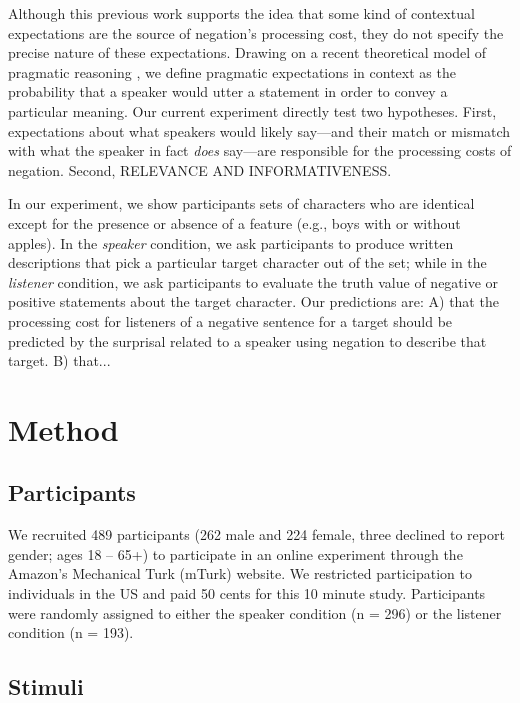 \documentclass[man, noapacite]{apa2}
\begin{document}
Although this previous work supports the idea that some kind of contextual expectations are the source of negation's processing cost, they do not specify the precise nature of these expectations. Drawing on a recent theoretical model of pragmatic reasoning \cite{frank2012}, we define pragmatic expectations in context as the probability that a speaker would utter a statement in order to convey a particular meaning. Our current experiment directly test two hypotheses. First, expectations about what speakers would likely say---and their match or mismatch with what the speaker in fact \emph{does} say---are responsible for the processing costs of negation. Second, RELEVANCE AND INFORMATIVENESS.

In our experiment, we show participants sets of characters who are identical except for the presence or absence of a feature (e.g., boys with or without apples). In the \emph{speaker} condition, we ask participants to produce written descriptions that pick a particular target character out of the set; while in the \emph{listener} condition, we ask participants to evaluate the truth value of negative or positive statements about the target character. Our predictions are: A) that the processing cost for listeners of a negative sentence for a target should be predicted by the surprisal \cite{levy2008} related to a speaker using negation to describe that target. B) that...

\section{Method}

\subsection{Participants} 

We recruited 489 participants (262 male and 224 female, three declined to report gender; ages 18 -- 65+) to participate in an online experiment through the Amazon's Mechanical Turk (mTurk) website.  We restricted participation to individuals in the US and paid 50 cents for this 10 minute study.  Participants were randomly assigned to either the speaker condition (n = 296) or the listener condition (n = 193).

\subsection{Stimuli}
\end{document}
